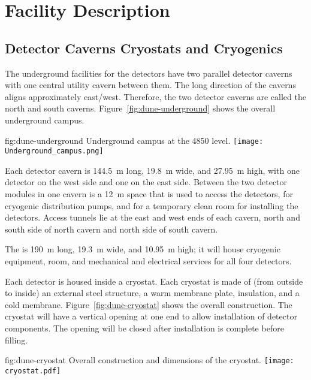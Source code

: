 ﻿\chapter{Facility Description}
\label{vl:tc-facility}


\section{Detector Caverns Cryostats and Cryogenics}
\label{sec:fdsp-coord-faci-caverns}


The underground facilities for the detectors have two parallel
detector caverns with one central utility cavern between them. The long
direction of the caverns aligns approximately east/west. Therefore, the two detector caverns are called the north and
south caverns. Figure~\ref{fig:dune-underground} shows the overall
underground campus.
\begin{dunefigure}{fig:dune-underground}
  {Underground campus at the 4850 level.}
  \texttt{[image: Underground\_campus.png]}
\end{dunefigure}


Each detector cavern is \SI{144.5}{\meter} long, \SI{19.8}{\meter}
wide, and \SI{27.95}{\meter} high, with
one detector on the west side and one on the east side. Between the two
detector modules in one cavern is a \SI{12}{\meter} space that
is used to access the detectors, for cryogenic distribution pumps,
and for a temporary clean room for installing the detectors. Access tunnels lie at the east and west ends of each cavern, north and south side of north cavern and north side of south cavern.


The  is \SI{190}{\meter} long, \SI{19.3}{\meter}
wide, and \SI{10.95}{\meter} high; it will house cryogenic equipment, 
room, and mechanical and electrical services for all four
detectors.


Each detector is housed inside a cryostat. Each cryostat is made of (from
outside to inside) an external steel structure, a warm membrane
plate, insulation, and a cold membrane. Figure~\ref{fig:dune-cryostat}
shows the overall construction. The cryostat will have a vertical
opening at one end to allow installation of detector
components. The opening will be closed after installation is complete before filling.
\begin{dunefigure}{fig:dune-cryostat}
  {Overall construction and dimensions of the  cryostat.}
  \texttt{[image: cryostat.pdf]}
\end{dunefigure}


